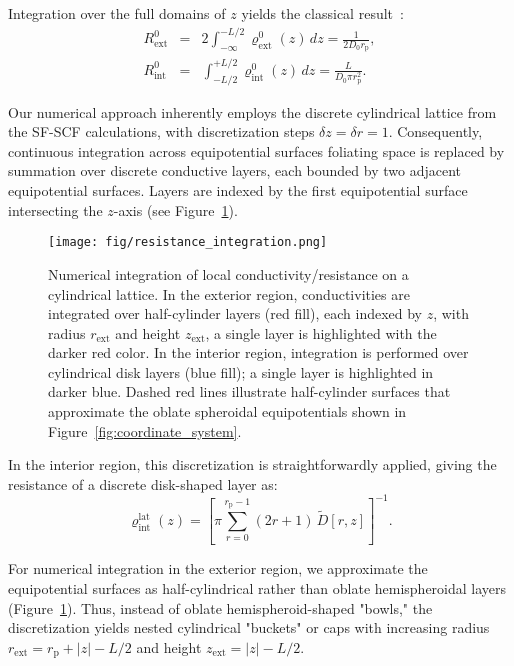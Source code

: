 \documentclass[10pt, a4paper, twocolumn]{article}
\begin{document}
Integration over the full domains of $z$ yields the classical result~\cite{Brunn1984}:
\begin{eqnarray}
    \label{eq:r_empty}
    R_{\text{ext}}^{0} &=& 2 \int_{-\infty}^{-L/2} \varrho_{\text{ext}}^{0}(z)\,dz = \frac{1}{2 D_0 r_{\text{p}}},\\[4pt]
    R_{\text{int}}^{0} &=& \int_{-L/2}^{+L/2} \varrho_{\text{int}}^{0}(z)\,dz = \frac{L}{D_0 \pi r_{\text{p}}^2}.
\end{eqnarray}

Our numerical approach inherently employs the discrete cylindrical lattice from the SF-SCF calculations, with discretization steps $\delta z = \delta r = 1$.
Consequently, continuous integration across equipotential surfaces foliating space is replaced by summation over discrete conductive layers, each bounded by two adjacent equipotential surfaces. 
Layers are indexed by the first equipotential surface intersecting the $z$-axis (see Figure~\ref{fig:integration_scheme}).

\begin{figure}[]
    \centering
    \texttt{[image: fig/resistance\_integration.png]}
    \caption{
        Numerical integration of local conductivity/resistance on a cylindrical lattice.
        In the exterior region, conductivities are integrated over half-cylinder layers (red fill), each indexed by $z$, with radius $r_{\text{ext}}$ and height $z_{\text{ext}}$, a single layer is highlighted with the darker red color.
        In the interior region, integration is performed over cylindrical disk layers (blue fill); a single layer is highlighted in darker blue.
        Dashed red lines illustrate half-cylinder surfaces that approximate the oblate spheroidal equipotentials shown in Figure~\ref{fig:coordinate_system}.
    }
    \label{fig:integration_scheme}
\end{figure}

In the interior region, this discretization is straightforwardly applied, giving the resistance of a discrete disk-shaped layer as:
\begin{equation}
    \varrho_{\text{int}}^{\text{lat}}(z) 
    =\left[\pi \sum_{r=0}^{r_{\text{p}}-1}(2r+1)\,\tilde{D}[r,z]\right]^{-1}.
\end{equation}

For numerical integration in the exterior region, we approximate the equipotential surfaces as half-cylindrical rather than oblate hemispheroidal layers (Figure~\ref{fig:integration_scheme}).
Thus, instead of oblate hemispheroid-shaped "bowls," the discretization yields nested cylindrical "buckets" or caps with increasing radius $r_{\text{ext}} = r_{\text{p}} + |z| - L/2$ and height $z_{\text{ext}} = |z| - L/2$.
\end{document}
